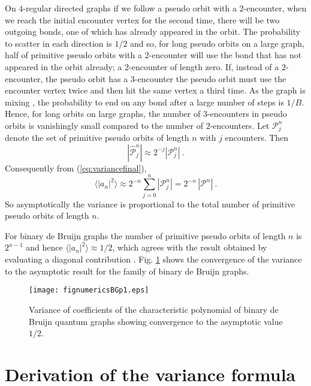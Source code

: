 \documentclass[doublecol]{epl2}
\begin{document}
On $4$-regular directed graphs if we follow a pseudo orbit with a $2$-encounter, when we reach the initial encounter vertex for the second time, there will be two outgoing bonds, one of which has already appeared in the orbit.  The probability to scatter in each direction is $1/2$ and so, for long pseudo orbits on a large graph, half of primitive pseudo orbits with a $2$-encounter will use the bond that has not appeared in the orbit already; a $2$-encounter of length zero.  If, instead of a $2$-encounter, the pseudo orbit has a $3$-encounter the pseudo orbit must use the encounter vertex twice and then hit the same vertex a third time.  As the graph is mixing \cite{KS99}, the probability to end on any bond after a large number of steps is $1/B$.  Hence, for long orbits on large graphs, the number of $3$-encounters in pseudo orbits is vanishingly small compared to the number of $2$-encounters.  Let $\mathcal{P}^n_j$ denote the set of primitive pseudo orbits of length $n$ with $j$ encounters.  Then
\begin{equation}\label{eq: asymp ratio}
|\widehat{\mathcal{P}}_{j}^n|\approx 2^{-j} |\mathcal{P}^n_j| \ .
\end{equation}
Consequently from (\ref{eq:variancefinal}),
\begin{equation}
\label{eq:varianceasmp}
\langle |a_n|^2 \rangle \approx 2^{-n} \sum_{j=0}^n |\mathcal{P}^n_j| = 2^{-n}\, |\mathcal{P}^n|  \ .
\end{equation}
So asymptotically the variance is proportional to the total number of primitive pseudo orbits of length $n$. 

For binary de Bruijn graphs the number of primitive pseudo orbits of length $n$ is $2^{n-1}$ \cite{BHS19} and hence $\langle |a_n|^2 \rangle\approx 1/2$, which agrees with the result obtained by evaluating a diagonal contribution \cite{T02, BHS19}.
Fig. \ref{fig: p=1 family} shows the convergence of the variance to the asymptotic result for the family of binary de Bruijn graphs.

\begin{figure}[htbp!]
	\texttt{[image: fignumericsBGp1.eps]}
	\caption{Variance of coefficients of the characteristic polynomial of binary de Bruijn quantum graphs showing convergence to the asymptotic value $1/2$.} 
	\label{fig: p=1 family}
\end{figure}

\section{Derivation of the variance formula}
\end{document}

